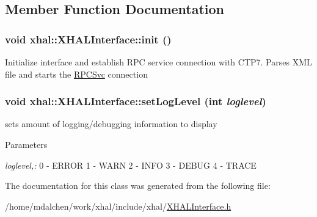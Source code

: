 \subsection{Member Function Documentation}
\hypertarget{classxhal_1_1XHALInterface_a37d127d6a407b73b9746de85d2bf5232}{
\subsubsection[{init}]{\setlength{\rightskip}{0pt plus 5cm}void xhal::XHALInterface::init ()}}
\label{classxhal_1_1XHALInterface_a37d127d6a407b73b9746de85d2bf5232}


Initialize interface and establish RPC service connection with CTP7. Parses XML file and starts the \hyperlink{classRPCSvc}{RPCSvc} connection \hypertarget{classxhal_1_1XHALInterface_af04487e30a68e8d479d8ae2ad7d0fc81}{
\subsubsection[{setLogLevel}]{\setlength{\rightskip}{0pt plus 5cm}void xhal::XHALInterface::setLogLevel (int {\em loglevel})}}
\label{classxhal_1_1XHALInterface_af04487e30a68e8d479d8ae2ad7d0fc81}


sets amount of logging/debugging information to display 
\begin{DoxyParams}{Parameters}
\item[{\em loglevel,:}]0 -\/ ERROR 1 -\/ WARN 2 -\/ INFO 3 -\/ DEBUG 4 -\/ TRACE \end{DoxyParams}


The documentation for this class was generated from the following file:\begin{DoxyCompactItemize}
\item 
/home/mdalchen/work/xhal/include/xhal/\hyperlink{XHALInterface_8h}{XHALInterface.h}\end{DoxyCompactItemize}
